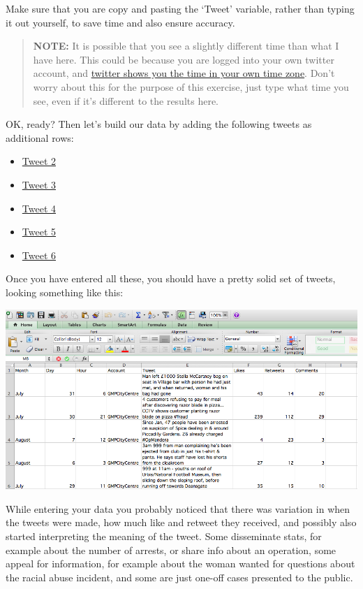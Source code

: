 \documentclass[
]{book}
\providecommand{\tightlist}{%
  \setlength{\itemsep}{0pt}\setlength{\parskip}{0pt}}
\begin{document}
Make sure that you are copy and pasting the `Tweet' variable, rather than typing it out yourself, to save time and also ensure accuracy.

\begin{quote}
\textbf{NOTE:} It is possible that you see a slightly different time than what I have here. This could be because you are logged into your own twitter account, and \href{http://www.adweek.com/digital/tweet-timestamps/}{twitter shows you the time in your own time zone}. Don't worry about this for the purpose of this exercise, just type what time you see, even if it's different to the results here.
\end{quote}

OK, ready? Then let's build our data by adding the following tweets as additional rows:

\begin{itemize}
\tightlist
\item
  \href{https://twitter.com/GMPCityCentre/status/891762454337867776}{Tweet 2}
\item
  \href{https://twitter.com/GMPCityCentre/status/894515606321590273}{Tweet 3}
\item
  \href{https://twitter.com/GMPCityCentre/status/894024570109386752}{Tweet 4}
\item
  \href{https://twitter.com/GMPCityCentre/status/891247668772708352}{Tweet 5}
\item
  \href{https://twitter.com/GMPCityCentre/status/891254643078176768}{Tweet 6}
\end{itemize}

Once you have entered all these, you should have a pretty solid set of tweets, looking something like this:

\includegraphics{imgs/gmp_tweets.png}

While entering your data you probably noticed that there was variation in when the tweets were made, how much like and retweet they received, and possibly also started interpreting the meaning of the tweet. Some disseminate stats, for example about the number of arrests, or share info about an operation, some appeal for information, for example about the woman wanted for questions about the racial abuse incident, and some are just one-off cases presented to the public.
\end{document}

